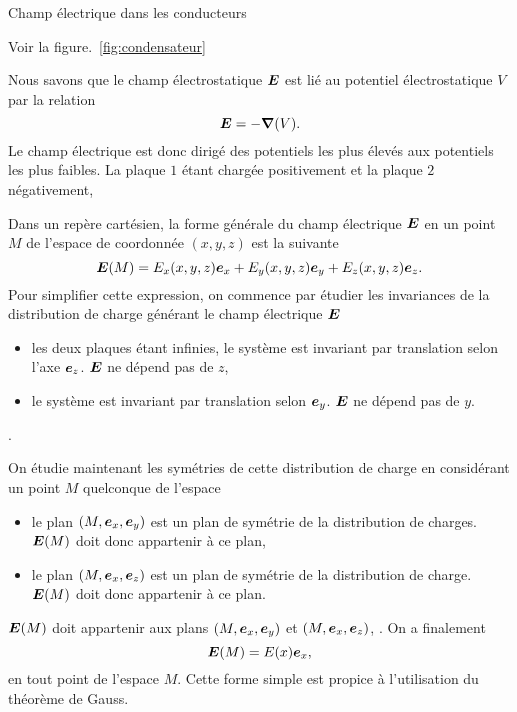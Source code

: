 \begin{corr}{Champ électrique dans les conducteurs}
\begin{corrlist}
	\item Voir la figure.~\ref{fig:condensateur}
	\item Nous savons que le champ électrostatique $\vece$ est lié au potentiel
	      électrostatique $V$ par la relation
	      \begin{equation*}
		      \vece = - \grad(V).
	      \end{equation*}
	      Le champ électrique est donc dirigé des potentiels les plus élevés 
	      aux potentiels les plus faibles. La plaque $1$ étant chargée positivement
	      et la plaque $2$ négativement, 
      \item Dans un repère cartésien, la forme générale du champ électrique $\vece$ 
	    en un point $M$ de l'espace de coordonnée $(x, y, z)$ est la suivante
	    \begin{equation*}
		    \vece(M) = E_x(x, y, z)\ex + E_y(x, y, z)\ey + E_z(x, y, z)\ez.
	    \end{equation*}
	    Pour simplifier cette expression, on commence par étudier les invariances de la
	    distribution de charge générant le champ électrique $\vece$
	    \begin{itemize}
		    \item les deux plaques étant infinies, le système est invariant
			  par translation selon l'axe $\ez$. $\vece$ ne dépend pas
			  de $z$,
		    \item le système est invariant par translation selon $\ey$.
			  $\vece$ ne dépend pas de $y$.
	   \end{itemize}
	   .

	   On étudie maintenant les symétries de cette distribution de charge 
	   en considérant un point $M$ quelconque de l'espace
	   \begin{itemize}
		   \item le plan $(M, \ex, \ey)$ est un plan de symétrie de 
			 la distribution de charges. $\vece(M)$ doit donc
			 appartenir à ce plan,
		   \item le plan $(M, \ex, \ez)$ est un plan de symétrie de la
			 distribution de charge. $\vece(M)$ doit donc appartenir
			 à ce plan.
	 \end{itemize}
	 $\vece(M)$ doit appartenir aux plans $(M, \ex, \ey)$ et $(M, \ex, \ez)$, 
	 . On a finalement
	 \begin{equation}
		 \vece(M) = E(x)\ex,
	 \end{equation}
	 en tout point de l'espace $M$. Cette forme simple est propice à 
	 l'utilisation du théorème de Gauss.


\end{corrlist}
\end{corr}
